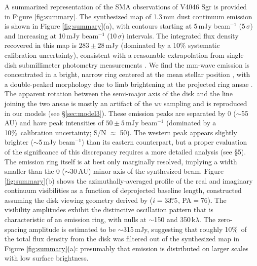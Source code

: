 {A summarized representation of the SMA observations of V4046 Sgr is provided in 
Figure \ref{fig:summary}.  The synthesized map of 1.3\,mm dust continuum 
emission is shown in Figure \ref{fig:summary}(a), with contours starting at 
5\,mJy beam$^{-1}$ (5\,$\sigma$) and increasing at 10\,mJy beam$^{-1}$ 
(10\,$\sigma$) intervals.  The integrated flux density recovered in this map is 
$283\pm28\,$mJy (dominated by a 10\% systematic calibration uncertainty), 
consistent with a reasonable extrapolation from single-dish submillimeter 
photometry measurements \citep{jensen96}.  We find the mm-wave emission is 
concentrated in a bright, narrow ring centered at the mean stellar position 
\citep[$\alpha = 18^{\rm h}16^{\rm m}10\fs49$, $-32\degr47\arcmin34\farcs50$, 
J2000;][]{zacharias10}, with a double-peaked morphology due to limb brightening 
at the projected ring ansae \citep[see][]{andrews11}.  The apparent rotation 
between the semi-major axis of the disk and the line joining the two ansae 
is mostly an artifact of the $uv$ sampling and is reproduced in our models (see 
\S \ref{sec:model3}).  These emission peaks are separated by 0 
($\sim$55\,AU) and have peak intensities of $50\pm5$\,mJy beam$^{-1}$ (dominated
by a 10\%\ calibration uncertainty; S/N $\approx$ 50).  The western peak appears
slightly brighter ($\sim$5\,mJy beam$^{-1}$) than its eastern counterpart, but a
proper evaluation of the significance of this discrepancy requires a more 
detailed analysis (see \S 5).  The emission ring itself is at best only 
marginally resolved, implying a width smaller than the 0 ($\sim$30\,AU) 
minor axis of the synthesized beam.  Figure \ref{fig:summary}(b) shows the 
azimuthally-averaged profile of the real and imaginary continuum visibilities as
a function of deprojected baseline length, constructed assuming the disk viewing
geometry derived by \citet{rosenfeld12} ($i=33\mbox{$.\!\!^\circ$}5$, PA$=76$\degr).  The 
visibility amplitudes exhibit the distinctive oscillation pattern that is 
characteristic of an emission ring, with nulls at $\sim$150 and 
350\,k$\lambda$.  The zero-spacing amplitude is estimated to be $\sim$315\,mJy, 
suggesting that roughly 10\%\ of the total flux density from the disk was 
filtered out of the synthesized map in Figure \ref{fig:summary}(a): presumably 
that emission is distributed on larger scales with low surface brightness.  

}
